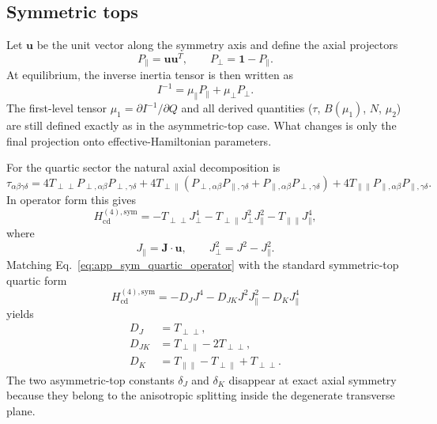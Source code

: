 \documentclass[aip,jcp,reprint,floatfix]{revtex4-2}
\begin{document}
\subsection{Symmetric tops}

Let $\mathbf u$ be the unit vector along the symmetry axis and define the axial
projectors
\begin{equation}
P_{\parallel} = \mathbf u\mathbf u^T,
\qquad
P_{\perp} = \mathbf 1 - P_{\parallel}.
\end{equation}
At equilibrium, the inverse inertia tensor is then written as
\begin{equation}
I^{-1} = \mu_{\parallel} P_{\parallel} + \mu_{\perp} P_{\perp}.
\end{equation}
The first-level tensor $\mu_1=\partial I^{-1}/\partial Q$ and all derived
quantities ($\tau$, $B(\mu_1)$, $N$, $\mu_2$) are still defined exactly as in
the asymmetric-top case. What changes is only the final projection onto
effective-Hamiltonian parameters.

For the quartic sector the natural axial decomposition is
\begin{equation}
\tau_{\alpha\beta\gamma\delta}
=
4T_{\perp\perp}
P_{\perp,\alpha\beta}P_{\perp,\gamma\delta}
+ 4T_{\perp\parallel}
\left(
P_{\perp,\alpha\beta}P_{\parallel,\gamma\delta}
+
P_{\parallel,\alpha\beta}P_{\perp,\gamma\delta}
\right)
+ 4T_{\parallel\parallel}
P_{\parallel,\alpha\beta}P_{\parallel,\gamma\delta}.
\label{eq:app_sym_tau_decomp}
\end{equation}
In operator form this gives
\begin{equation}
H_{\mathrm{cd}}^{(4),\mathrm{sym}}
=
-T_{\perp\perp} J_{\perp}^4
-T_{\perp\parallel} J_{\perp}^2 J_{\parallel}^2
-T_{\parallel\parallel} J_{\parallel}^4,
\label{eq:app_sym_quartic_operator}
\end{equation}
where
\begin{equation}
J_{\parallel} = \mathbf J\!\cdot\!\mathbf u,
\qquad
J_{\perp}^2 = J^2 - J_{\parallel}^2.
\end{equation}
Matching Eq.~\eqref{eq:app_sym_quartic_operator} with the standard
symmetric-top quartic form
\begin{equation}
H_{\mathrm{cd}}^{(4),\mathrm{sym}}
=
-D_J J^4
-D_{JK} J^2 J_{\parallel}^2
-D_K J_{\parallel}^4
\end{equation}
yields
\begin{align}
D_J &= T_{\perp\perp}, \\
D_{JK} &= T_{\perp\parallel} - 2T_{\perp\perp}, \\
D_K &= T_{\parallel\parallel} - T_{\perp\parallel} + T_{\perp\perp}.
\label{eq:app_sym_quartic_constants}
\end{align}
The two asymmetric-top constants $\delta_J$ and $\delta_K$ disappear at exact
axial symmetry because they belong to the anisotropic splitting inside the
degenerate transverse plane.
\end{document}
